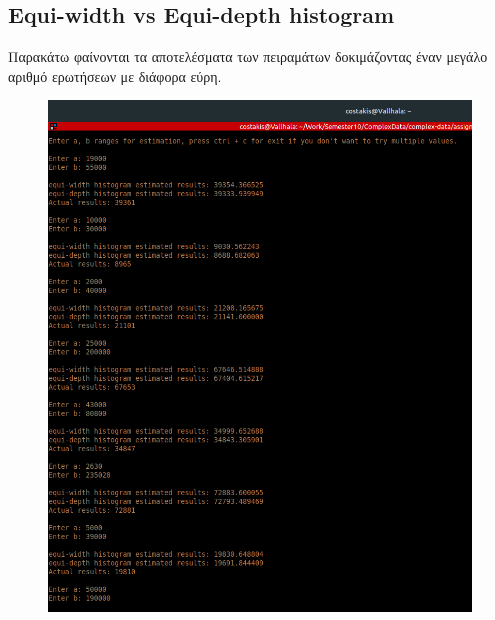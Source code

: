 \documentclass{article}[40pt]
\begin{document}
\subsection{Equi-width vs Equi-depth histogram}
Παρακάτω φαίνονται τα αποτελέσματα των πειραμάτων δοκιμάζοντας έναν μεγάλο αριθμό ερωτήσεων με διάφορα εύρη.\\
\begin{figure}[htpb!]
\includegraphics[scale=0.4]{estimations1.png}
\end{figure}
\end{document}
